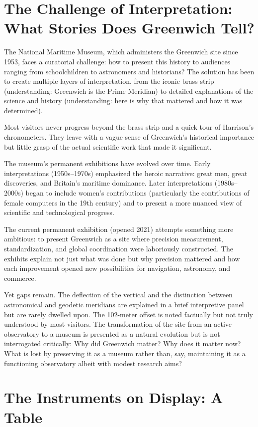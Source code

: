 \section{The Challenge of Interpretation: What Stories Does Greenwich Tell?}

The National Maritime Museum, which administers the Greenwich site since 1953, faces a curatorial challenge: how to present this history to audiences ranging from schoolchildren to astronomers and historians? The solution has been to create multiple layers of interpretation, from the iconic brass strip (understanding: Greenwich is the Prime Meridian) to detailed explanations of the science and history (understanding: here is why that mattered and how it was determined).

Most visitors never progress beyond the brass strip and a quick tour of Harrison's chronometers. They leave with a vague sense of Greenwich's historical importance but little grasp of the actual scientific work that made it significant.

The museum's permanent exhibitions have evolved over time. Early interpretations (1950s–1970s) emphasized the heroic narrative: great men, great discoveries, and Britain's maritime dominance. Later interpretations (1980s–2000s) began to include women's contributions (particularly the contributions of female computers in the 19th century) and to present a more nuanced view of scientific and technological progress.

The current permanent exhibition (opened 2021) attempts something more ambitious: to present Greenwich as a site where precision measurement, standardization, and global coordination were laboriously constructed. The exhibits explain not just what was done but why precision mattered and how each improvement opened new possibilities for navigation, astronomy, and commerce.

Yet gaps remain. The deflection of the vertical and the distinction between astronomical and geodetic meridians are explained in a brief interpretive panel but are rarely dwelled upon. The 102-meter offset is noted factually but not truly understood by most visitors. The transformation of the site from an active observatory to a museum is presented as a natural evolution but is not interrogated critically: Why did Greenwich matter? Why does it matter now? What is lost by preserving it as a museum rather than, say, maintaining it as a functioning observatory albeit with modest research aims?

\section{The Instruments on Display: A Table}

